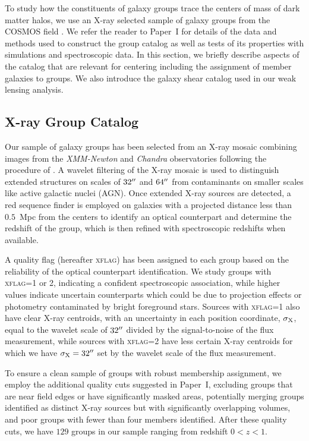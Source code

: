To study how the constituents of galaxy groups trace the centers of
mass of 
dark matter halos, we use an X-ray selected sample of galaxy groups
from the COSMOS field \citep{Scoville2007a}. We refer the reader to
Paper~I for details of the data and methods used to construct the
group catalog as well as tests of its properties with simulations and
spectroscopic data. In this section, we briefly describe aspects of the
catalog that are relevant for centering including the assignment of
member galaxies to groups. We also introduce the galaxy shear catalog
used in our weak lensing analysis.

\subsection{X-ray Group Catalog}
\label{cen_s:xray}

Our sample of galaxy groups has been selected from an X-ray mosaic
combining images from the {\sl XMM-Newton} \citep{Hasinger2007} and
{\sl Chandra} \citep{Elvis2009} observatories following the procedure
of \citet{Finoguenov2009, Finoguenov2010}. A wavelet filtering of the
X-ray mosaic is used to distinguish extended structures on scales of
$32\mbox{$^{\prime\prime}$}$ and $64\mbox{$^{\prime\prime}$}$ from contaminants on smaller scales like
active galactic nuclei (AGN). Once extended X-ray sources are
detected, a red sequence finder is employed on galaxies with a
projected distance less than $0.5$~Mpc from the centers to identify an
optical counterpart and determine the redshift of the group, which is
then refined with spectroscopic redshifts when available.

A quality flag (hereafter \textsc{xflag}) has been assigned to each group
based on the reliability of the optical counterpart identification. We
study groups with \textsc{xflag}=1 or 2, indicating a confident spectroscopic
association, while higher values indicate uncertain counterparts which
could be due to projection effects or photometry contaminated by
bright foreground stars. Sources with \textsc{xflag}=1 also have clear
X-ray centroids, with an uncertainty in each position coordinate,
$\sigma_{\rm X}$, equal to the wavelet scale of $32\mbox{$^{\prime\prime}$}$ divided by
the signal-to-noise of the flux measurement, while sources with
\textsc{xflag}=2 have less certain X-ray centroids for which we have
$\sigma_{\rm X} = 32\mbox{$^{\prime\prime}$}$ set by the wavelet scale of the flux
measurement. 

To ensure a clean sample of groups with robust membership assignment,
we employ the additional quality cuts suggested in Paper~I, excluding
groups that are near field edges or have significantly masked areas,
potentially merging groups identified as distinct X-ray sources but
with significantly overlapping volumes, and poor groups with fewer
than four members identified. After these quality cuts, we have $129$
groups in our sample ranging from redshift $0<z<1$.


